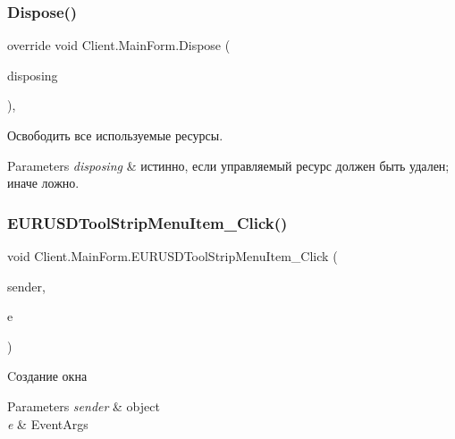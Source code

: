 \subsubsection{\texorpdfstring{Dispose()}{Dispose()}}
{\footnotesize\ttfamily override void Client.\+Main\+Form.\+Dispose (\begin{DoxyParamCaption}\item[{bool}]{disposing }\end{DoxyParamCaption})\hspace{0.3cm}{\ttfamily [inline]}, {\ttfamily [protected]}}



Освободить все используемые ресурсы. 


\begin{DoxyParams}{Parameters}
{\em disposing} & истинно, если управляемый ресурс должен быть удален; иначе ложно.\\
\hline
\end{DoxyParams}
\hypertarget{class_client_1_1_main_form_a736b03fd5ca2af0171db525573891553}{}\label{class_client_1_1_main_form_a736b03fd5ca2af0171db525573891553} 
\subsubsection{\texorpdfstring{E\+U\+R\+U\+S\+D\+Tool\+Strip\+Menu\+Item\+\_\+\+Click()}{EURUSDToolStripMenuItem\_Click()}}
{\footnotesize\ttfamily void Client.\+Main\+Form.\+E\+U\+R\+U\+S\+D\+Tool\+Strip\+Menu\+Item\+\_\+\+Click (\begin{DoxyParamCaption}\item[{object}]{sender,  }\item[{Event\+Args}]{e }\end{DoxyParamCaption})\hspace{0.3cm}{\ttfamily [inline]}}



Cоздание окна 


\begin{DoxyParams}{Parameters}
{\em sender} & object\\
\hline
{\em e} & Event\+Args\\
\hline
\end{DoxyParams}
\hypertarget{class_client_1_1_main_form_ae2d7d0d2a2ce5e8495d2e17e162e5506}{}\label{class_client_1_1_main_form_ae2d7d0d2a2ce5e8495d2e17e162e5506} 
